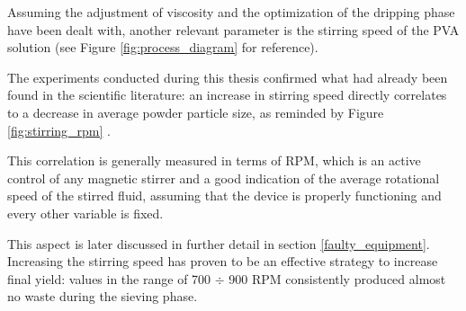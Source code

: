 \documentclass{article}
\begin{document}

        Assuming the adjustment of viscosity and the optimization of the dripping phase have been dealt with, 
        another relevant parameter is the stirring speed of the PVA solution (see Figure \ref{fig:process_diagram} for reference). 

        The experiments conducted during this thesis confirmed what had already been found in the scientific literature: 
        an increase in stirring speed directly correlates to a decrease in average powder particle size, as reminded by Figure \ref{fig:stirring_rpm}
        \autocites{DechetMaximilianA2020OtDo}. 

        This correlation is generally measured in terms of RPM, which is an active control of any magnetic stirrer and 
        a good indication of the average rotational speed of the stirred fluid, assuming that the device is properly functioning
        and every other variable is fixed. 
        
%
%
%
%
        This aspect is later discussed in further detail in section \ref{faulty_equipment}. \\ 

        Increasing the stirring speed has proven to be an effective 
        strategy to increase final yield: values in the range of 700 $\div $ 900 RPM consistently produced almost no waste during the sieving phase. 
\end{document}
